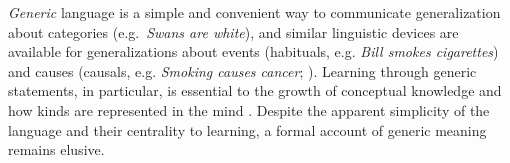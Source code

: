 \documentclass[11pt,letterpaper]{article}
\begin{document}
\emph{Generic} language is a simple and convenient way to communicate generalization about categories (e.g.~\emph{Swans are white}), and similar linguistic devices are available for generalizations about events (habituals, e.g. \emph{Bill smokes cigarettes}) and causes (causals, e.g. \emph{Smoking causes cancer}; ). 
Learning through generic statements, in particular, is essential to the growth of conceptual knowledge \cite{Gelman2004} and how kinds are represented in the mind \cite{Leslie2008}.
Despite the apparent simplicity of the language and their centrality to learning, a formal account of generic meaning remains elusive. 
\end{document}
